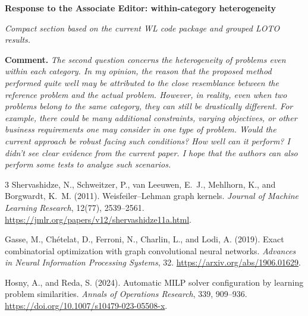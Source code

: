 \documentclass[10pt]{article}
\begin{document}
\textbf{\large Response to the Associate Editor: within-category heterogeneity}

\textit{Compact section based on the current WL code package and grouped LOTO results.}

\textbf{Comment.} \textit{The second question concerns the heterogeneity of
problems even within each category. In my opinion, the reason that the
proposed method performed quite well may be attributed to the close
resemblance between the reference problem and the actual problem. However,
in reality, even when two problems belong to the same category, they can
still be drastically different. For example, there could be many additional
constraints, varying objectives, or other business requirements one may
consider in one type of problem. Would the current approach be robust
facing such conditions? How well can it perform? I didn't see clear evidence
from the current paper. I hope that the authors can also perform some tests
to analyze such scenarios.}



\begin{thebibliography}{3}
Shervashidze, N., Schweitzer, P., van Leeuwen, E.~J., Mehlhorn, K.,
and Borgwardt, K.~M. (2011).
Weisfeiler--Lehman graph kernels.
\emph{Journal of Machine Learning Research}, 12(77), 2539--2561.
\url{https://jmlr.org/papers/v12/shervashidze11a.html}.

Gasse, M., Ch\'{e}telat, D., Ferroni, N., Charlin, L., and Lodi, A. (2019).
Exact combinatorial optimization with graph convolutional neural networks.
\emph{Advances in Neural Information Processing Systems}, 32.
\url{https://arxiv.org/abs/1906.01629}.

Hosny, A., and Reda, S. (2024).
Automatic MILP solver configuration by learning problem similarities.
\emph{Annals of Operations Research}, 339, 909--936.
\url{https://doi.org/10.1007/s10479-023-05508-x}.
\end{thebibliography}
\end{document}
